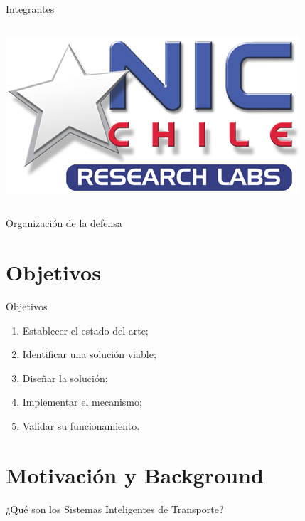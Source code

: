 \documentclass[aspectratio=169]{beamer}
\begin{document}
\begin{frame}{Integrantes}
\begin{columns}
\begin{column}{.5\textwidth}
        \vspace{0.05\textheight}
        \includegraphics[height=.25\textheight]{figuras/niclabs.png}    
    \end{column}
\end{columns}    
\end{frame}

\begin{frame}{Organización de la defensa}
\tableofcontents
\note{
    \tableofcontents
}
\end{frame}

\section{Objetivos}
\begin{frame}{Objetivos}
\begin{enumerate}
    \item Establecer el estado del arte;\pause
    \item Identificar una solución viable;\pause
    \item Diseñar la solución;\pause
    \item Implementar el mecanismo;\pause
    \item Validar su funcionamiento.
\end{enumerate}
\end{frame}

\section{Motivación y Background}

\begin{frame}[standout]
\centering
¿Qué son los Sistemas Inteligentes de Transporte?
\end{frame}
\end{document}
